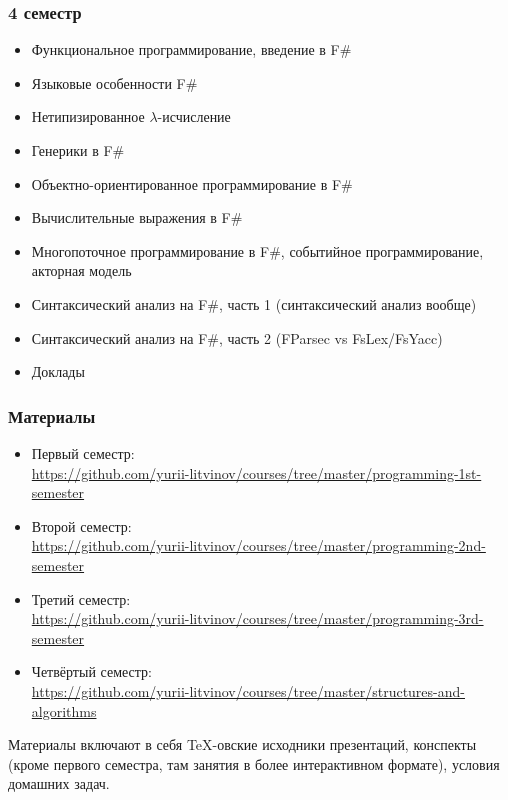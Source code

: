 \documentclass[xetex,mathserif,serif]{beamer}
\begin{document}
    \begin{frame}
        \frametitle{4 семестр}
        \begin{scriptsize}
            \begin{itemize}
                \item Функциональное программирование, введение в F\#
                \item Языковые особенности F\#
                \item Нетипизированное $\lambda$-исчисление
                \item Генерики в F\#
                \item Объектно-ориентированное программирование в F\#
                \item Вычислительные выражения в F\#
                \item Многопоточное программирование в F\#, событийное программирование, акторная модель
                \item Синтаксический анализ на F\#, часть 1 (синтаксический анализ вообще)
                \item Синтаксический анализ на F\#, часть 2 (FParsec vs FsLex/FsYacc)
                \item Доклады
            \end{itemize}
        \end{scriptsize}
    \end{frame}

    \begin{frame}
        \frametitle{Материалы}
        \begin{scriptsize}
            \begin{itemize}
                \item Первый семестр: \\
                    \url{https://github.com/yurii-litvinov/courses/tree/master/programming-1st-semester}
                \item Второй семестр: \\
                    \url{https://github.com/yurii-litvinov/courses/tree/master/programming-2nd-semester}
                \item Третий семестр: \\
                    \url{https://github.com/yurii-litvinov/courses/tree/master/programming-3rd-semester}
                \item Четвёртый семестр: \\
                    \url{https://github.com/yurii-litvinov/courses/tree/master/structures-and-algorithms}
            \end{itemize}
            Материалы включают в себя TeX-овские исходники презентаций, конспекты (кроме первого семестра, там занятия в более интерактивном формате), условия домашних задач.
        \end{scriptsize}
    \end{frame}
\end{document}
